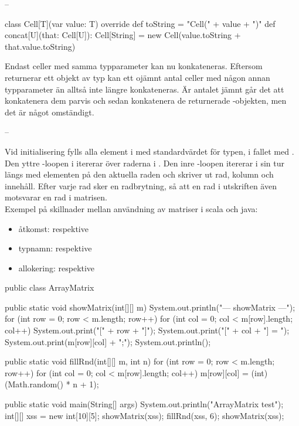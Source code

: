 \Task     %

\Subtask --

\Subtask \begin{Code}
class Cell[T](var value: T){
	override def toString = "Cell(" + value + ")"
	def concat[U](that: Cell[U]): Cell[String] =
		new Cell(value.toString + that.value.toString)
}
\end{Code}

\Subtask  Endast celler med samma typparameter kan nu konkateneras. Eftersom  returnerar ett objekt av typ  kan ett ojämnt antal celler med någon annan typparameter än  alltså inte längre konkateneras. Är antalet jämnt går det att konkatenera dem parvis och sedan konkatenera de returnerade -objekten, men det är något omständigt.

\Subtask  --


\Task     %

\Subtask Vid initialisering fylls alla element i  med standardvärdet för typen,  i fallet med . Den yttre -loopen i  itererar över raderna i . Den inre -loopen itererar i sin tur längs med elementen på den aktuella raden och skriver ut rad, kolumn och innehåll. Efter varje rad sker en radbrytning, så att en rad i utskriften även motsvarar en rad i matrisen.\\
Exempel på skillnader mellan användning av matriser i scala och java:
\begin{itemize}
\item åtkomst:  respektive 
\item typnamn:  respektive  
\item allokering:  respektive 
\end{itemize}

\Subtask \begin{Code}
public class ArrayMatrix {

	public static void showMatrix(int[][] m){
		System.out.println("\n--- showMatrix ---");
		for (int row = 0; row < m.length; row++){
			for (int col = 0; col < m[row].length; col++) {
				System.out.print("[" + row + "]");
				System.out.print("[" + col + "] = ");
				System.out.print(m[row][col] + ";");
			} System.out.println();
		}
	}

	public static void fillRnd(int[][] m, int n){
		for (int row = 0; row < m.length; row++){
			for (int col = 0; col < m[row].length; col++) {
				m[row][col] = (int) (Math.random() * n + 1);
			}
		}
	}

	public static void main(String[] args) {
		System.out.println("ArrayMatrix test");
		int[][] xss = new int[10][5];
		showMatrix(xss);
		fillRnd(xss, 6);
		showMatrix(xss);
	}
}
\end{Code}

